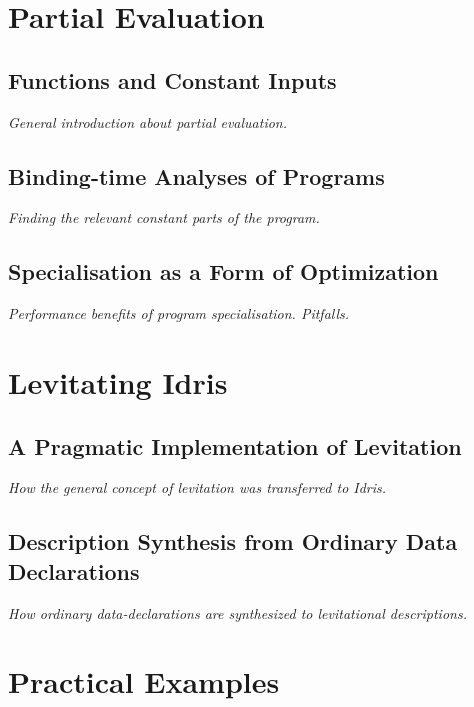 \documentclass{ituthesis}
\begin{document}
\chapter{Partial Evaluation}
\label{cha:PartialEvaluation}

\section{Functions and Constant Inputs}
\label{sec:FunctionsandConstantInputs}
\textit{General introduction about partial evaluation.}

\section{Binding-time Analyses of Programs}
\label{sec:Binding-timeAnalysisofPrograms}
\textit{Finding the relevant constant parts of the program.}

\section{Specialisation as a Form of Optimization}
\label{sec:SpecialisationasaFormofOptimization}
\textit{Performance benefits of program specialisation. Pitfalls.}

\chapter{Levitating Idris}
\label{cha:LevitatingIdris}

\section{A Pragmatic Implementation of Levitation}
\label{sec:APragmaticImplementationofLevitation}
\textit{How the general concept of levitation was transferred to Idris.}

\section{Description Synthesis from Ordinary Data Declarations}
\label{sec:DescriptionSynthesisFromOrdinaryDataDeclarations}
\textit{How ordinary data-declarations are synthesized to levitational descriptions.}

\chapter{Practical Examples}
\label{cha:PracticalExamples}
\end{document}
